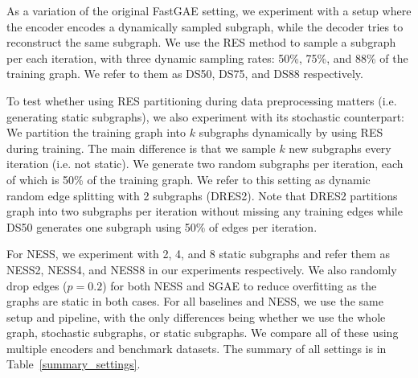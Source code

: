 \documentclass{article}
\begin{document}
As a variation of the original FastGAE setting, we experiment with a setup where the encoder encodes a dynamically sampled subgraph, while the decoder tries to reconstruct the same subgraph. We use the RES method to sample a subgraph per each iteration, with three dynamic sampling rates: 50\%, 75\%, and 88\% of the training graph. We refer to them as DS50, DS75, and DS88 respectively.

To test whether using RES partitioning during data preprocessing matters (i.e. generating static subgraphs), we also experiment with its stochastic counterpart: We partition the training graph into $k$ subgraphs dynamically by using RES during training. The main difference is that we sample $k$ new subgraphs every iteration (i.e. not static). We generate two random subgraphs per iteration, each of which is 50\% of the training graph. We refer to this setting as dynamic random edge splitting with 2 subgraphs (DRES2). Note that DRES2 partitions graph into two subgraphs per iteration without missing any training edges while DS50 generates one subgraph using 50\% of edges per iteration.

For NESS, we experiment with 2, 4, and 8 static subgraphs and refer them as NESS2, NESS4, and NESS8 in our experiments respectively. We also randomly drop edges ($p=0.2$) for both NESS and SGAE to reduce overfitting as the graphs are static in both cases. For all baselines and NESS, we use the same setup and pipeline, with the only differences being whether we use the whole graph, stochastic subgraphs, or static subgraphs. We compare all of these using multiple encoders and benchmark datasets. The summary of all settings is in Table~\ref{summary_settings}.
\end{document}
